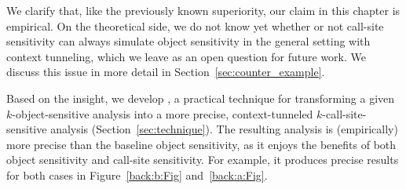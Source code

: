 
We clarify that, like the previously known superiority, our claim in this chapter is empirical. 
On the theoretical side, we do not know yet whether or not call-site sensitivity can always simulate object sensitivity in the general setting with context tunneling, which we leave as an open question for future work. We discuss this issue in more detail in Section~\ref{sec:counter_example}.


\myparagraph{\ourtechnique}
Based on the insight, 
we develop \ourtechnique, a practical technique for transforming a given $k$-object-sensitive analysis 
into a more precise, context-tunneled $k$-call-site-sensitive analysis (Section~\ref{sec:technique}).  The
resulting analysis is (empirically) more precise than the baseline
object sensitivity, as it enjoys the benefits of both object
sensitivity and call-site sensitivity. For example, it
produces precise results for both cases in Figure~\ref{back:b:Fig} and~\ref{back:a:Fig}.


